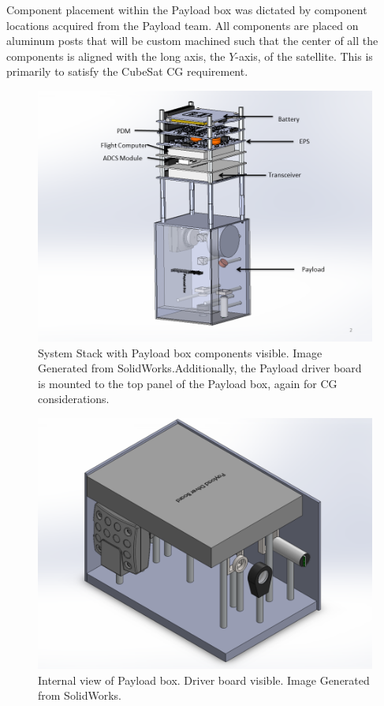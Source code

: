 \documentclass[12pt]{article}
\begin{document}
Component placement within the Payload box was dictated by component locations acquired from the Payload team. All components are placed on aluminum posts that will be custom machined such that the center of all the components is aligned with the long axis, the $Y$-axis, of the satellite. This is primarily to satisfy the CubeSat CG requirement.

\begin{figure}[!ht]
\centering
\includegraphics[width=6in]{images/STR-9.png}
\caption{System Stack with Payload box components visible. Image Generated from SolidWorks.Additionally, the Payload driver board is mounted to the top panel of the Payload box, again for CG considerations.}
\label{fig:str-9}
\end{figure}

\begin{figure}[!ht]
\centering
\includegraphics[width=4.5in]{images/STR-10.png}
\caption{Internal view of Payload box. Driver board visible. Image Generated from SolidWorks.}
\label{fig:str-10}
\end{figure}
\end{document}
